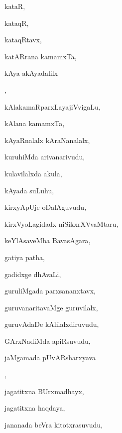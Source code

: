 \begin{multicols}{3}
{\noindent
{kataR}, \pageref{kataR}

\noindent
{kataqR}, \pageref{kataqR}

\noindent
{kataqRtavx}, \pageref{kataqRtavx}

\noindent
{katARrana kamamxTa}, \pageref{katARrana kamamxTa}

\noindent
{kAya akAyadalilx}

\noindent
{}, \pageref{kAya akAyadalilx aDaguvudu}

\noindent
{kAlakamaRparxLayajiVvigaLu}, \pageref{kAlakamaRparxLayajiVvigaLu}

\noindent
{kAlana kamamxTa}, \pageref{kAlana kamamxTa}

\noindent
{kAyaRnalalx kAraNanalalx}, \pageref{kAyaRnalalx kAraNanalalx}

\noindent
{kuruhiMda arivanarivudu}, \pageref{kuruhiMda arivanarivudu}

\noindent
{kulavilalxda akula}, \pageref{kulavilalxda akula}

\noindent
{kAyada suLuhu}, \pageref{kAyada suLuhu}

\noindent
{kirxyApUje oDalAguvudu}, \pageref{kirxyApUje oDalAguvudu}

\noindent
{kirxVyoLagidadx niSikxrXVvaMtaru}, \pageref{kirxVyoLagidadx niSikxrXVvaMtaru}

\noindent
{keYlAsaveMba BavasAgara}, \pageref{keYlAsaveMba BavasAgara}

\noindent
{gatiya patha}, \pageref{gatiya patha}

\noindent
{gadidxge dhAvaLi}, \pageref{gadidxge dhAvaLi}

\noindent
{guruliMgada parxsananxtavx}, \pageref{guruliMgada parxsananxtavx}

\noindent
{guruvanaritavaMge guruvilalx}, \pageref{guruvanaritavaMge guruvilalx}

\noindent
{guruvAdaDe kAlilalxdiruvudu}, \pageref{guruvAdaDe kAlilalxdiruvudu}

\noindent
{GArxNadiMda apiRsuvudu}, \pageref{GArxNadiMda apiRsuvudu}

\noindent
{jaMgamada pUvARsharxyava}

\noindent
{}, \pageref{jaMgamada pUvARsharxyava kaLeyuvudu}

\noindent
{jagatitxna BUrxmadhayx}, \pageref{jagatitxna BUrxmadhayx}

\noindent
{jagatitxna haqdaya}, \pageref{jagatitxna haqdaya}

\noindent
{jananada beVra kitotxrasuvudu}, \pageref{jananada beVra kitotxrasuvudu}

}
\end{multicols}
